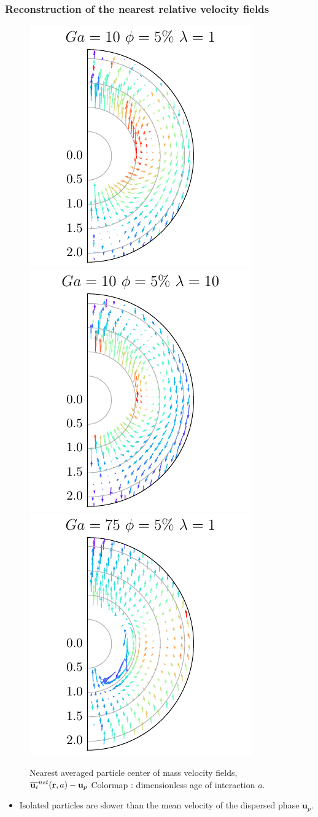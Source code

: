 \documentclass{sintefbeamer}
\begin{document}
\begin{frame}
  \frametitle{Reconstruction of the nearest relative velocity fields}
  \begin{figure}
    
    \includegraphics[height=0.35\textwidth]{image/HOMOGENEOUS/fDrop/U_l_1_Ga_10_PHI_5.pdf}
    \includegraphics[height=0.35\textwidth]{image/HOMOGENEOUS/fDrop/U_l_10_Ga_10_PHI_5.pdf}
    \includegraphics[height=0.35\textwidth]{image/HOMOGENEOUS/fDrop/U_l_1_Ga_75_PHI_5.pdf}
    \caption{ Nearest averaged particle center of mass velocity fields, $\overline{\textbf{u}_i}^{nst} (\textbf{r},a) - \textbf{u}_p$
    Colormap : dimensionless age of interaction $a$. }
  \end{figure}

\begin{itemize}
  \item Isolated particles are slower than the mean velocity of the dispersed phase $\textbf{u}_p$.
\end{itemize}

\end{frame}
\end{document}
